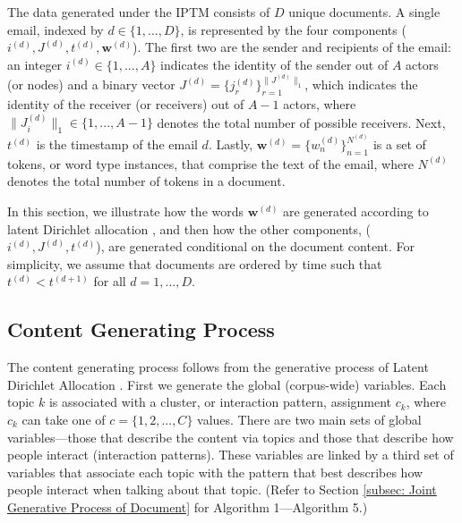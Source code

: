 The data generated under the IPTM consists of $D$ unique documents. A single email, indexed by $d \in \{1,...,D\}$, is represented by the four components ($i^{(d)}, J^{(d)}, t^{(d)},  \boldsymbol{w}^{(d)}$). The first two are the sender and recipients of the email: an integer $i^{(d)} \in \{1,...,A\}$ indicates the identity of the sender out of $A$ actors (or nodes) and a binary vector $J^{(d)} = \{j_r^{(d)}\}_{r=1}^{\lVert J^{(d)} \rVert_1} $, which indicates the identity of the receiver (or receivers) out of $A-1$ actors, where $\lVert J_{i}^{(d)} \rVert_1\in \{1,...,A-1\}$ denotes the total number of possible receivers. Next, $t^{(d)}$ is the timestamp of the email $d$. Lastly, $\boldsymbol{w}^{(d)} = \{w^{(d)}_n \}_{n=1}^{N^{(d)}}$ is a set of tokens, or word type instances, that comprise the text of the email, where $N^{(d)}$ denotes the total number of tokens in a document. 

In this section, we illustrate how the words $\boldsymbol{w}^{(d)}$ are generated according to latent Dirichlet allocation \citep{Blei2003}, and then how the other components, ($i^{(d)}, J^{(d)}, t^{(d)}$), are generated conditional on the document content. For simplicity, we assume that documents are ordered by time such that $t^{(d)} < t^{(d+1)}$ for all $d=1, ..., D$. 
\subsection{Content Generating Process} \label{subsec: Content Generating Process} 
The content generating process follows from the generative process of Latent Dirichlet Allocation \cite{Blei2003}. First we generate the global (corpus-wide) variables. Each topic $k$ is associated with a cluster, or interaction pattern, assignment $c_k$, where $c_k$ can take one of $c = \{1,2,...,C\}$ values.  There are two main sets of global variables---those that describe the content via topics and those that describe how people interact (interaction patterns). These variables are linked by a third set of variables that associate each topic with the pattern that best describes how people interact when talking about that topic. (Refer to Section \ref{subsec: Joint Generative Process of Document} for Algorithm 1---Algorithm 5.)

